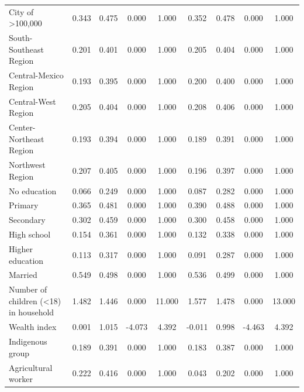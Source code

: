 \documentclass[12pt,english,british]{article}
\begin{document}
\begin{table}[h]
\begin{center}
\begin{adjustbox}{max width=\textwidth}
{\begin{tabular}{l*{2}{cccc}}
City of >100,000    &       0.343&       0.475&       0.000&       1.000&       0.352&       0.478&       0.000&       1.000\\
South-Southeast Region&       0.201&       0.401&       0.000&       1.000&       0.205&       0.404&       0.000&       1.000\\
Central-Mexico Region&       0.193&       0.395&       0.000&       1.000&       0.200&       0.400&       0.000&       1.000\\
Central-West Region &       0.205&       0.404&       0.000&       1.000&       0.208&       0.406&       0.000&       1.000\\
Center-Northeast Region&       0.193&       0.394&       0.000&       1.000&       0.189&       0.391&       0.000&       1.000\\
Northwest Region    &       0.207&       0.405&       0.000&       1.000&       0.196&       0.397&       0.000&       1.000\\
No education        &       0.066&       0.249&       0.000&       1.000&       0.087&       0.282&       0.000&       1.000\\
Primary             &       0.365&       0.481&       0.000&       1.000&       0.390&       0.488&       0.000&       1.000\\
Secondary           &       0.302&       0.459&       0.000&       1.000&       0.300&       0.458&       0.000&       1.000\\
High school         &       0.154&       0.361&       0.000&       1.000&       0.132&       0.338&       0.000&       1.000\\
Higher education    &       0.113&       0.317&       0.000&       1.000&       0.091&       0.287&       0.000&       1.000\\
Married             &       0.549&       0.498&       0.000&       1.000&       0.536&       0.499&       0.000&       1.000\\
Number of children (<18) in household&       1.482&       1.446&       0.000&      11.000&       1.577&       1.478&       0.000&      13.000\\
Wealth index        &       0.001&       1.015&      -4.073&       4.392&      -0.011&       0.998&      -4.463&       4.392\\
Indigenous group    &       0.189&       0.391&       0.000&       1.000&       0.183&       0.387&       0.000&       1.000\\
Agricultural worker &       0.222&       0.416&       0.000&       1.000&       0.043&       0.202&       0.000&       1.000\\

\end{tabular}}
\end{adjustbox}
\end{center}
\end{table}
\end{document}
